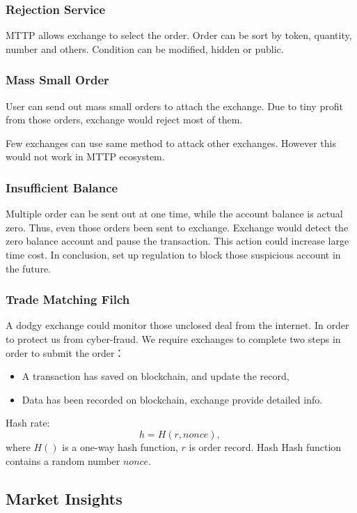 \documentclass[UTF8,nofonts]{article}
\begin{document}
\subsubsection{Rejection Service}

MTTP allows exchange to select the order. Order can be sort by token,  quantity,  number and others. Condition can be modified,  hidden or public.

\subsubsection{Mass Small Order}
User can send out mass small orders to attach the exchange. Due to tiny profit from those orders,  exchange would reject most of them.

Few exchanges can use same method to attack other exchanges. However this would not work in MTTP ecosystem.

\subsubsection{Insufficient Balance}

Multiple order can be sent out at one time,  while the account balance is actual zero. Thus,  even those orders been sent to exchange. Exchange would detect the zero balance account and pause the transaction. This action could increase large time cost. In conclusion,  set up regulation to block those suspicious account in the future.

\subsubsection{Trade Matching Filch}

A dodgy exchange could monitor those unclosed deal from the internet. In order to protect us from cyber-fraud. We require exchanges to complete two steps in order to submit the order：
\begin{itemize}
  \item A transaction has saved on blockchain,  and update the record,
  \item Data has been recorded on blockchain,  exchange provide detailed info.
\end{itemize}
Hash rate:
$$h = H(r,  nonce)\text{, }$$
where $H()$ is a one-way hash function, $r$ is order record. Hash Hash function contains a random number $nonce$.

\subsection{Market Insights\label{sec: marketdepth}}
\end{document}
